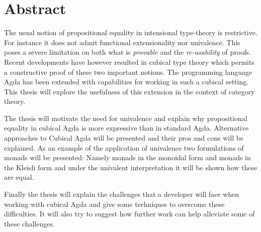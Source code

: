 \chapter*{Abstract}
The usual notion of propositional equality in intensional type-theory
is restrictive. For instance it does not admit functional
extensionality nor univalence. This poses a severe limitation on both
what is \emph{provable} and the \emph{re-usability} of proofs. Recent
developments have however resulted in cubical type theory which
permits a constructive proof of these two important notions. The
programming language Agda has been extended with capabilities for
working in such a cubical setting. This thesis will explore the
usefulness of this extension in the context of category theory.

The thesis will motivate the need for univalence and explain why
propositional equality in cubical Agda is more expressive than in
standard Agda. Alternative approaches to Cubical Agda will be
presented and their pros and cons will be explained. As an example of
the application of univalence two formulations of monads will be
presented: Namely monads in the monoidal form and monads in the
Kleisli form and under the univalent interpretation it will be shown
how these are equal.

Finally the thesis will explain the challenges that a developer will
face when working with cubical Agda and give some techniques to
overcome these difficulties. It will also try to suggest how further
work can help alleviate some of these challenges.
